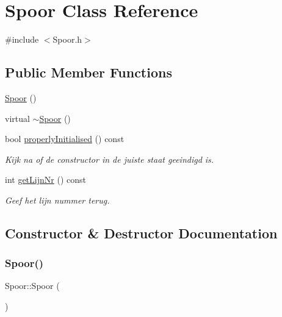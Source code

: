 \hypertarget{class_spoor}{}\section{Spoor Class Reference}
\label{class_spoor}


{\ttfamily \#include $<$Spoor.\+h$>$}

\subsection*{Public Member Functions}
\begin{DoxyCompactItemize}
\item 
\hyperlink{class_spoor_a64778a4094d2d9cd3a08cbbef5a11787}{Spoor} ()
\item 
virtual \hyperlink{class_spoor_a58dcc52a48e4ad3ca7d9028a0065ca98}{$\sim$\+Spoor} ()
\item 
bool \hyperlink{class_spoor_a1eb7c54228676cdb7c8620104e063a3c}{properly\+Initialised} () const
\begin{DoxyCompactList}\small\item\em Kijk na of de constructor in de juiste staat geeindigd is. \end{DoxyCompactList}\item 
int \hyperlink{class_spoor_a66ebc0abcb370b1509bd7b3961a8e45a}{get\+Lijn\+Nr} () const
\begin{DoxyCompactList}\small\item\em Geef het lijn nummer terug. \end{DoxyCompactList}\end{DoxyCompactItemize}


\subsection{Constructor \& Destructor Documentation}
\mbox{\label{class_spoor_a64778a4094d2d9cd3a08cbbef5a11787}} 
\subsubsection{\texorpdfstring{Spoor()}{Spoor()}}
{\footnotesize\ttfamily Spoor\+::\+Spoor (\begin{DoxyParamCaption}{ }\end{DoxyParamCaption})}

\mbox{\label{class_spoor_a58dcc52a48e4ad3ca7d9028a0065ca98}} 
